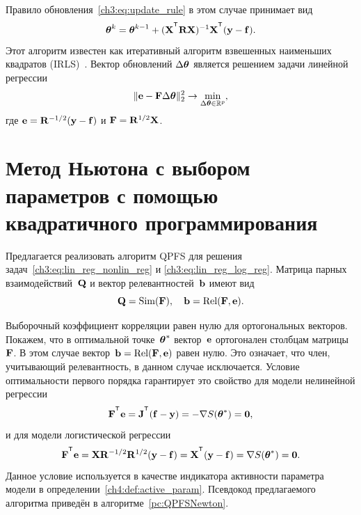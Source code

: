 Правило обновления~\eqref{ch3:eq:update_rule} в этом случае принимает вид
\[
\btheta^k = \btheta^{k - 1} + (\bX^{\T} \bR \bX)^{-1} \bX^{\T} (\by - \mathbf{f}).
\]
Этот алгоритм известен как итеративный алгоритм взвешенных наименьших квадратов (IRLS)~\cite{holland1977robust}. Вектор обновлений $\Delta \boldsymbol{\theta}$ является решением задачи линейной регрессии
\begin{equation}
\| \mathbf{e} - \mathbf{F} \Delta \boldsymbol{\theta} \|_2^2 \rightarrow \min_{\Delta \boldsymbol{\theta} \in \mathbb{R}^{p}},
\label{ch3:eq:lin_reg_log_reg}
\end{equation}
где $\mathbf{e} = \mathbf{R}^{-1/2} (\mathbf{y} - \mathbf{f})$ и $\mathbf{F} = \mathbf{R}^{1/2}\mathbf{X}$.

\section{Метод Ньютона с выбором параметров с помощью квадратичного программирования}
\label{sec:ch4:newton_qpfs_algorithm}

Предлагается реализовать алгоритм QPFS для решения задач~\eqref{ch3:eq:lin_reg_nonlin_reg} и \eqref{ch3:eq:lin_reg_log_reg}. 
Матрица парных взаимодействий~$\mathbf{Q}$ и вектор релевантностей~$\mathbf{b}$ имеют вид
\[
\mathbf{Q} = \text{Sim} (\mathbf{F}), \quad \mathbf{b} = \text{Rel} (\mathbf{F}, \mathbf{e}).
\]

Выборочный коэффициент корреляции равен нулю для ортогональных векторов.
Покажем, что в оптимальной точке~$\boldsymbol{\theta}^*$ вектор~$\mathbf{e}$ ортогонален столбцам матрицы~$\mathbf{F}$. 
В этом случае вектор~$\mathbf{b} = \text{Rel} (\mathbf{F}, \mathbf{e})$ равен нулю. Это означает, что член, учитывающий релевантность, в данном случае исключается.
Условие оптимальности первого порядка гарантирует это свойство для модели нелинейной регрессии
\[
\bF^{\T} \be = \bJ^{\T} (\mathbf{f} - \by) = - \nabla S(\btheta^*) = \boldsymbol{0},
\]
и для модели логистической регрессии
\[
\bF^{\T} \be = \bX \bR^{-1/2} \bR^{1/2} (\by - \mathbf{f}) = \bX^{\T} (\by - \mathbf{f}) = \nabla S(\btheta^*) = \boldsymbol{0}.
\]
Данное условие используется в качестве индикатора активности параметра модели в определении~\ref{ch4:def:active_param}.
Псевдокод предлагаемого алгоритма приведён в алгоритме~\ref{pc:QPFSNewton}.

